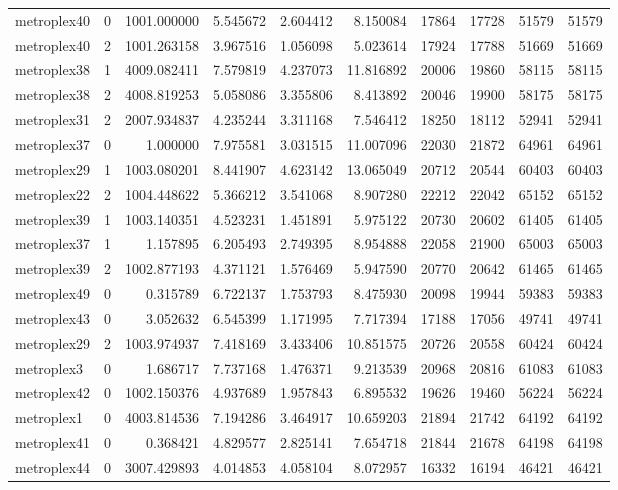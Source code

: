 \begin{longtable}{|l|r|r|r|r|r|r|r|r|r|}
metroplex40 & 0 & 1001.000000 & 5.545672 & 2.604412 & 8.150084 & 17864 & 17728 & 51579 & 51579 \\
metroplex40 & 2 & 1001.263158 & 3.967516 & 1.056098 & 5.023614 & 17924 & 17788 & 51669 & 51669 \\
metroplex38 & 1 & 4009.082411 & 7.579819 & 4.237073 & 11.816892 & 20006 & 19860 & 58115 & 58115 \\
metroplex38 & 2 & 4008.819253 & 5.058086 & 3.355806 & 8.413892 & 20046 & 19900 & 58175 & 58175 \\
metroplex31 & 2 & 2007.934837 & 4.235244 & 3.311168 & 7.546412 & 18250 & 18112 & 52941 & 52941 \\
metroplex37 & 0 & 1.000000 & 7.975581 & 3.031515 & 11.007096 & 22030 & 21872 & 64961 & 64961 \\
metroplex29 & 1 & 1003.080201 & 8.441907 & 4.623142 & 13.065049 & 20712 & 20544 & 60403 & 60403 \\
metroplex22 & 2 & 1004.448622 & 5.366212 & 3.541068 & 8.907280 & 22212 & 22042 & 65152 & 65152 \\
metroplex39 & 1 & 1003.140351 & 4.523231 & 1.451891 & 5.975122 & 20730 & 20602 & 61405 & 61405 \\
metroplex37 & 1 & 1.157895 & 6.205493 & 2.749395 & 8.954888 & 22058 & 21900 & 65003 & 65003 \\
metroplex39 & 2 & 1002.877193 & 4.371121 & 1.576469 & 5.947590 & 20770 & 20642 & 61465 & 61465 \\
metroplex49 & 0 & 0.315789 & 6.722137 & 1.753793 & 8.475930 & 20098 & 19944 & 59383 & 59383 \\
metroplex43 & 0 & 3.052632 & 6.545399 & 1.171995 & 7.717394 & 17188 & 17056 & 49741 & 49741 \\
metroplex29 & 2 & 1003.974937 & 7.418169 & 3.433406 & 10.851575 & 20726 & 20558 & 60424 & 60424 \\
metroplex3 & 0 & 1.686717 & 7.737168 & 1.476371 & 9.213539 & 20968 & 20816 & 61083 & 61083 \\
metroplex42 & 0 & 1002.150376 & 4.937689 & 1.957843 & 6.895532 & 19626 & 19460 & 56224 & 56224 \\
metroplex1 & 0 & 4003.814536 & 7.194286 & 3.464917 & 10.659203 & 21894 & 21742 & 64192 & 64192 \\
metroplex41 & 0 & 0.368421 & 4.829577 & 2.825141 & 7.654718 & 21844 & 21678 & 64198 & 64198 \\
metroplex44 & 0 & 3007.429893 & 4.014853 & 4.058104 & 8.072957 & 16332 & 16194 & 46421 & 46421 \\

\end{longtable}
